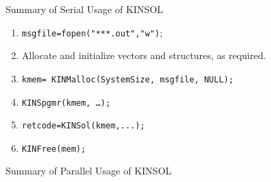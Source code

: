\noindent
{Summary of Serial Usage of KINSOL} \label{serial-usage}
\vspace{.2 in}
\begin{enumerate}

\item {\tt msgfile=fopen("***.out","w")};

\item Allocate and initialize vectors and structures, as required.

\item  {\tt kmem= KINMalloc(SystemSize, msgfile,  NULL);}

\item  {\tt KINSpgmr(kmem, \ldots);}

\item  {\tt retcode=KINSol(kmem,...);}
	
\item  {\tt KINFree(mem);}

\end{enumerate}
\vspace{.2 in}
{Summary of Parallel Usage of KINSOL} \label{parallel-usage}
\vspace{.2 in}
